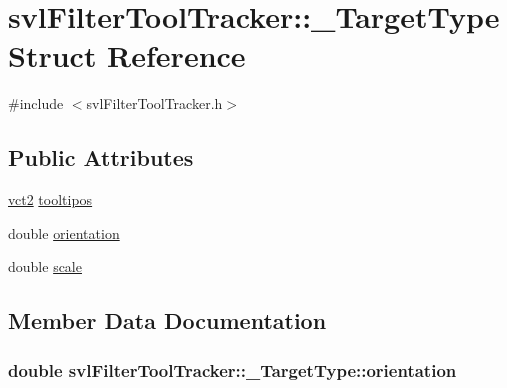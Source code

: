 \hypertarget{structsvl_filter_tool_tracker_1_1___target_type}{}\section{svl\+Filter\+Tool\+Tracker\+:\+:\+\_\+\+Target\+Type Struct Reference}
\label{structsvl_filter_tool_tracker_1_1___target_type}


{\ttfamily \#include $<$svl\+Filter\+Tool\+Tracker.\+h$>$}

\subsection*{Public Attributes}
\begin{DoxyCompactItemize}
\item 
\hyperlink{vct_fixed_size_vector_types_8h_a88481ac3c794867ba5e4e92624f0d958}{vct2} \hyperlink{structsvl_filter_tool_tracker_1_1___target_type_a66b5c46a3d281d97a8394b62afce58d1}{tooltipos}
\item 
double \hyperlink{structsvl_filter_tool_tracker_1_1___target_type_a8a69c9b0f6d7a51e35c0b9298786bfa0}{orientation}
\item 
double \hyperlink{structsvl_filter_tool_tracker_1_1___target_type_a41580992baafb3f771b25c8c7d133477}{scale}
\end{DoxyCompactItemize}


\subsection{Member Data Documentation}
\hypertarget{structsvl_filter_tool_tracker_1_1___target_type_a8a69c9b0f6d7a51e35c0b9298786bfa0}{}
\subsubsection[{orientation}]{\setlength{\rightskip}{0pt plus 5cm}double svl\+Filter\+Tool\+Tracker\+::\+\_\+\+Target\+Type\+::orientation}\label{structsvl_filter_tool_tracker_1_1___target_type_a8a69c9b0f6d7a51e35c0b9298786bfa0}
\hypertarget{structsvl_filter_tool_tracker_1_1___target_type_a41580992baafb3f771b25c8c7d133477}{}
